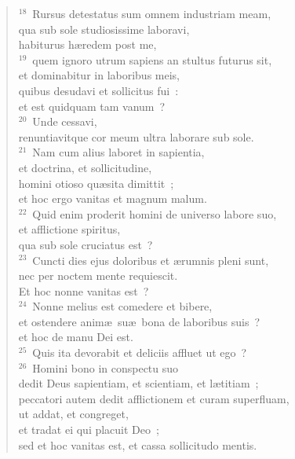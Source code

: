 \begin{flushleft}\begin{verse}${}^{18}$~Rursus detestatus sum omnem industriam meam,\\ qua sub sole studiosissime laboravi,\\ habiturus h\ae redem post me,\\
${}^{19}$~quem ignoro utrum sapiens an stultus futurus sit,\\ et dominabitur in laboribus meis,\\ quibus desudavi et sollicitus fui~:\\ et est quidquam tam vanum~?\\
${}^{20}$~Unde cessavi,\\ renuntiavitque cor meum ultra laborare sub sole.\\
${}^{21}$~Nam cum alius laboret in sapientia,\\ et doctrina, et sollicitudine,\\ homini otioso qu\ae sita dimittit~;\\ et hoc ergo vanitas et magnum malum.\\
${}^{22}$~Quid enim proderit homini de universo labore suo,\\ et afflictione spiritus,\\ qua sub sole cruciatus est~?\\
${}^{23}$~Cuncti dies ejus doloribus et \ae rumnis pleni sunt,\\ nec per noctem mente requiescit.\\ Et hoc nonne vanitas est~?\\
${}^{24}$~Nonne melius est comedere et bibere,\\ et ostendere anim\ae\ su\ae\ bona de laboribus suis~?\\ et hoc de manu Dei est.\\
${}^{25}$~Quis ita devorabit et deliciis affluet ut ego~?\\
${}^{26}$~Homini bono in conspectu suo\\ dedit Deus sapientiam, et scientiam, et l\ae titiam~;\\ peccatori autem dedit afflictionem et curam superfluam,\\ ut addat, et congreget,\\ et tradat ei qui placuit Deo~;\\ sed et hoc vanitas est, et cassa sollicitudo mentis.\end{verse}\end{flushleft}



